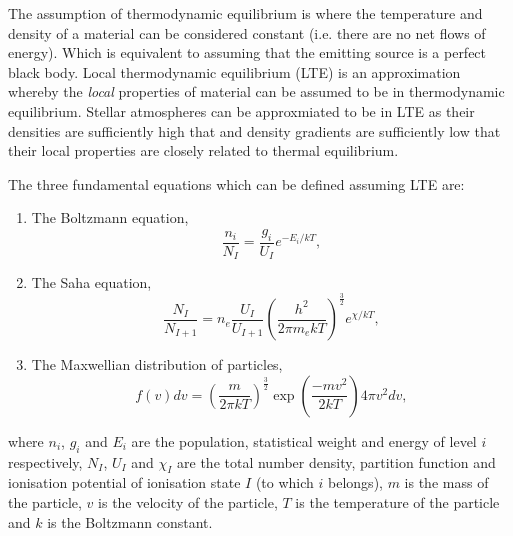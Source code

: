 The assumption of thermodynamic equilibrium is where the temperature and density of a material can be considered constant (i.e. there are no net flows of energy).
Which is equivalent to assuming that the emitting source is a perfect black body.
Local thermodynamic equilibrium (LTE) is an approximation whereby the {\it local} properties of material can be assumed to be in thermodynamic equilibrium.
Stellar atmospheres can be approxmiated to be in LTE as their densities are sufficiently high that and density gradients are sufficiently low that their local properties are closely related to thermal equilibrium.

The three fundamental equations which can be defined assuming LTE are:

\begin{enumerate}
    \item The Boltzmann equation,
    \begin{equation}
        \frac{n_i}{N_I} = \frac{g_i}{U_I}e^{-E_i/kT},
    \end{equation}
    \item The Saha equation,
    \begin{equation}
        \frac{N_I}{N_{I+1}} = n_e\frac{U_I}{U_{I+1}}\left(\frac{h^2}{2\pi m_ekT}\right)^\frac{3}{2} e^{\chi/kT},
    \end{equation}
    \item The Maxwellian distribution of particles,
    \begin{equation}
        f(v)dv = \left(\frac{m}{2\pi kT}\right)^\frac{3}{2} \exp\left(\frac{-mv^2}{2kT}\right)4\pi v^2dv,
    \end{equation}
\end{enumerate}

\noindent where $n_i$, $g_i$ and $E_i$ are the population, statistical weight and energy of level $i$ respectively,
$N_I$, $U_I$ and $\chi_I$ are the total number density, partition function and ionisation potential of ionisation state $I$ (to which $i$ belongs),
$m$ is the mass of the particle, $v$ is the velocity of the particle, $T$ is the temperature of the particle and $k$ is the Boltzmann constant.





